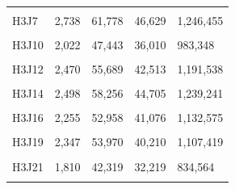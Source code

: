 \documentclass[
  a4paper,
  titlepage]{article}
\begin{document}
\begin{longtable}[t]{lllll}
\cellcolor{gray!6}{H3J6} & \cellcolor{gray!6}{2,212} & \cellcolor{gray!6}{52,100} & \cellcolor{gray!6}{40,234} & \cellcolor{gray!6}{1,168,329}\\
 
H3J7 & 2,738 & 61,778 & 46,629 & 1,246,455\\
 
\cellcolor{gray!6}{H3J8} & \cellcolor{gray!6}{2,306} & \cellcolor{gray!6}{53,255} & \cellcolor{gray!6}{40,243} & \cellcolor{gray!6}{1,098,086}\\
 
H3J10 & 2,022 & 47,443 & 36,010 & 983,348\\
 
\cellcolor{gray!6}{H3J11} & \cellcolor{gray!6}{2,526} & \cellcolor{gray!6}{58,076} & \cellcolor{gray!6}{43,890} & \cellcolor{gray!6}{1,148,159}\\
 
H3J12 & 2,470 & 55,689 & 42,513 & 1,191,538\\
 
\cellcolor{gray!6}{H3J13} & \cellcolor{gray!6}{2,533} & \cellcolor{gray!6}{57,812} & \cellcolor{gray!6}{43,613} & \cellcolor{gray!6}{1,186,962}\\
 
H3J14 & 2,498 & 58,256 & 44,705 & 1,239,241\\
 
\cellcolor{gray!6}{H3J15} & \cellcolor{gray!6}{2,704} & \cellcolor{gray!6}{61,077} & \cellcolor{gray!6}{45,784} & \cellcolor{gray!6}{1,292,316}\\
 
H3J16 & 2,255 & 52,958 & 41,076 & 1,132,575\\
 
\cellcolor{gray!6}{H3J18} & \cellcolor{gray!6}{2,331} & \cellcolor{gray!6}{52,741} & \cellcolor{gray!6}{39,796} & \cellcolor{gray!6}{1,129,451}\\
 
H3J19 & 2,347 & 53,970 & 40,210 & 1,107,419\\
 
\cellcolor{gray!6}{H3J20} & \cellcolor{gray!6}{2,305} & \cellcolor{gray!6}{52,807} & \cellcolor{gray!6}{40,564} & \cellcolor{gray!6}{1,143,409}\\
 
H3J21 & 1,810 & 42,319 & 32,219 & 834,564\\
 
\cellcolor{gray!6}{H3J22} & \cellcolor{gray!6}{1,995} & \cellcolor{gray!6}{47,066} & \cellcolor{gray!6}{36,192} & \cellcolor{gray!6}{966,538}\\
 

\end{longtable}
\end{document}
